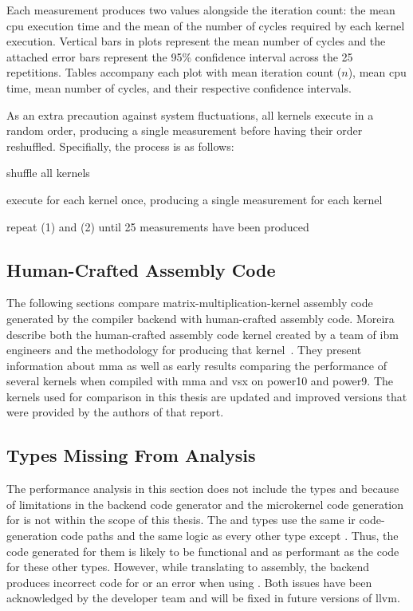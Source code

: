 \documentclass[\main/thesis.tex]{subfiles}
\begin{document}
Each measurement produces two values alongside the iteration count: the mean \gls{cpu} execution time and the mean of the number of cycles required by each kernel execution.
Vertical bars in plots represent the mean number of cycles and the attached error bars represent the 95\% confidence interval across the 25 repetitions.
Tables accompany each plot with mean iteration count ($n$), mean \gls{cpu} time, mean number of cycles, and their respective confidence intervals.

As an extra precaution against system fluctuations, all kernels execute in a random order, producing a single measurement before having their order reshuffled.
Specifially, the process is as follows:
\begin{enumerate*}[itemjoin={{; }}, itemjoin*={{; }}, label=(\arabic*), after={.}]
  \item shuffle all kernels
  \item execute  for each kernel once, producing a single measurement for each kernel
  \item repeat (1) and (2) until 25 measurements have been produced
\end{enumerate*}

\subsection{Human-Crafted Assembly Code}
The following sections compare matrix-multiplication-kernel assembly code generated by the compiler backend with human-crafted assembly code.
Moreira \etal describe both the human-crafted assembly code kernel created by a team of \gls{ibm} engineers and the methodology for producing that kernel~\autocite{moreira2021matrix}.
They present information about \gls{mma} as well as early results comparing the performance of several kernels when compiled with \gls{mma} and \gls{vsx} on \gls{power10} and \gls{power}9.
The kernels used for comparison in this thesis are updated and improved versions that were provided by the authors of that report.

\subsection{Types Missing From Analysis}
The performance analysis in this section does not include the types  and  because of limitations in the backend code generator and the microkernel code generation for  is not within the scope of this thesis.
The  and  types use the same \gls{ir} code-generation code paths and the same logic as every other type except .
Thus, the code generated for them is  likely to be functional and as performant as the code for these other types.
However, while translating to assembly, the backend produces incorrect code for  or an error when using .
Both issues have been acknowledged by the developer team and will be fixed in future versions of \gls{llvm}.
\end{document}
